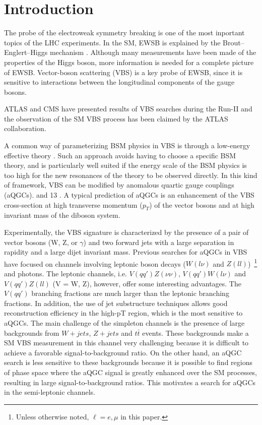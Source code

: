 \chapter{Introduction}
The probe of the electroweak symmetry breaking is one of the most inportant topics of the LHC experiments.
In the SM, EWSB is explained by the Brout–Englert–Higgs mechanism \cite{}. 
Although many measurements have been made of the properties of the Higgs boson, more information is needed for a complete picture of EWSB. Vector-boson scattering (VBS) is a key probe of EWSB, since it is sensitive to interactions between the longitudinal components of the gauge bosons.

ATLAS and CMS have presented results of VBS searches during the Run-II \cite{STDM-2017-19,CMS-SMP-20-001} and the observation of the SM VBS process has been claimed by the ATLAS collaboration.

A common way of parameterizing BSM physics in VBS is through a low-energy effective theory \cite{Longhitano:1980tm}. Such an approach avoids having to choose a specific BSM theory, and is particularly well suited if the energy scale of the BSM physics is too high for the new resonances of the theory to be observed directly. In this kind of framework, VBS can be modified by anomalous quartic gauge couplings (aQGCs). 
\cite{STDM-2013-06,STDM-2013-05,STDM-2014-02, STDM-2014-01, STDM-2014-05, STDM-2015-07,
STDM-2015-09, CMS-SMP-13-009, CMS-SMP-13-015, CMS-FSQ-13-008}
and 13 \TeV
.
A typical prediction of aQGCs is an enhancement of the VBS cross-section at high transverse momentum ($p_T$) of the vector bosons and at high invariant mass of the diboson system.

Experimentally, the VBS signature is characterized by the presence of a pair of vector bosons (W, Z, or $\gamma$) and two forward jets with a large separation in rapidity and a large dijet invariant mass. Previous searches for aQGCs in VBS have focused on channels involving leptonic boson decays ($W(l\nu)$ and $Z(ll)$)~\footnote{Unless otherwise noted, $\ell=e,\mu$ in this paper.} and photons.
The leptonic channels, i.e. $V(qq')Z(\nu\nu)$, $V(qq')W(l\nu)$ and $V(qq')Z(ll)$ (V = W, Z), however, offer some interesting advantages. The $V(qq')$ branching fractions are much larger than the leptonic branching fractions. In addition, the use of jet substructure techniques allows good reconstruction efficiency in the high-pT region, which is the most sensitive to aQGCs.
The main challenge of the simpleton channels is the presence of large backgrounds from $W + jets$, $Z + jets$ and $t\bar{t}$ events. These backgrounds make a SM VBS measurement in this channel very challenging because it is difficult to achieve a favorable signal-to-background ratio. On the other hand, an aQGC search is less sensitive to these backgrounds because it is possible to find regions of phase space where the aQGC signal is greatly enhanced over the SM processes, resulting in large signal-to-background ratios. This motivates a search for aQGCs in the semi-leptonic channels.


